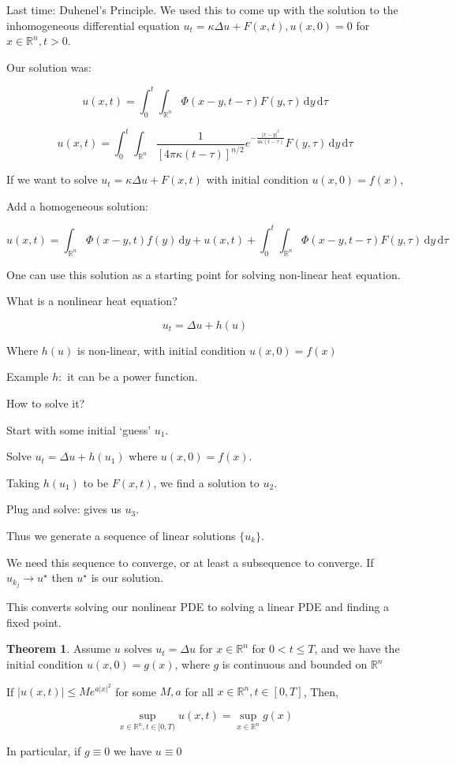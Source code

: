 \documentclass{article}
\theoremstyle{definition}
\newtheorem{theorem}{Theorem}
\begin{document}
Last time: Duhenel's Principle. We used this to come up with the solution to the inhomogeneous differential equation \(u_t = \kappa \Delta u + F(x,t), u(x,0)=0\) for \(x\in \mathbb{R}^n, t > 0\).

Our solution was:

\[
    u(x,t) = \int_{0}^{t} \int_{\mathbb{R}^n}^{} \Phi(x-y,t-\tau)F(y,\tau) \,\mathrm{d}y  \,\mathrm{d}\tau 
\]

\[
    u(x,t) = \int_{0}^{t} \int_{\mathbb{R}^n}^{} \frac{1}{[4\pi\kappa(t-\tau)]^{n / 2}}e ^ {- \frac{\vert x-y \vert ^2}{4 \kappa (t-\tau)} }F(y,\tau) \,\mathrm{d}y  \,\mathrm{d}\tau 
\]

If we want to solve \(u_t = \kappa \Delta u + F(x,t)\) with initial condition \(u(x,0)=f(x)\),

Add a homogeneous solution:

\[
    u(x,t) = \int_{\mathbb{R}^n}^{} \Phi(x-y,t)f(y) \,\mathrm{d}y + u(x,t) + \int_{0}^{t} \int_{\mathbb{R}^n}^{} \Phi(x-y,t-\tau)F(y,\tau) \,\mathrm{d}y  \,\mathrm{d}\tau 
\]

One can use this solution as a starting point for solving non-linear heat equation.

What is a nonlinear heat equation?

\[
    u_t = \Delta u + h(u)
\]

Where \(h(u)\) is non-linear, with initial condition \(u(x,0) = f(x)\)

Example \(h:\) it can be a power function.

How to solve it?

Start with some initial `guess' \(u_1\).

Solve \(u_t = \Delta u + h(u_1)\) where \(u(x,0)=f(x)\).

Taking \(h(u_1)\) to be \(F(x,t)\), we find a solution to \(u_2\).

Plug and solve: gives us \(u_3\).

Thus we generate a sequence of linear solutions \(\{ u_k \} \).

We need this sequence to converge, or at least a subsequence to converge. If \(u_{k_j}\to u^{\star}\) then \(u^{\star}\) is our solution.

This converts solving our nonlinear PDE to solving a linear PDE and finding a fixed point.

\begin{theorem}
    Assume \(u\) solves \(u_t = \Delta u\) for \(x\in \mathbb{R}^n\) for \(0 < t \leq T\), and we have the initial condition \(u(x,0) = g(x)\), where \(g\) is continuous and bounded on \(\mathbb{R}^n\) 

    If \(\vert u(x,t) \vert \leq M e^{a \vert x \vert ^2}\) for some \(M,a\) for all \(x\in\mathbb{R}^n, t\in [0,T]\), Then,

    \[
        \sup_{x\in\mathbb{R}^n, t\in [0,T)} u(x,t) = \sup_{x\in\mathbb{R}^n} g(x)
    \]

    In particular, if \(g \equiv 0\) we have \(u \equiv 0\) 

\end{theorem}
\end{document}
